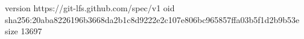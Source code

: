 version https://git-lfs.github.com/spec/v1
oid sha256:20aba8226196b3668da2b1c8d9222e2c107e806bc965857ffa03b5f1d2b9b53e
size 13697
